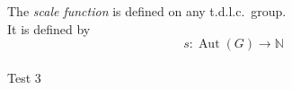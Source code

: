 \documentclass[preview]{standalone}
\begin{document}
The \textit{scale function} is defined on any t.d.l.c.\ group.\\It is defined by \[ s : \operatorname{Aut}(G) \to \mathbb{N} \]\\Test 3\\
\end{document}
